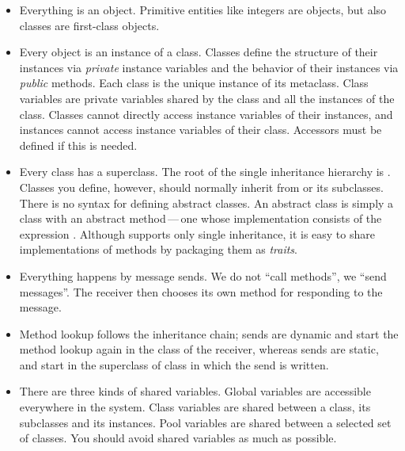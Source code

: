 \documentclass[a4paper,10pt,twoside]{book}
\begin{document}
\begin{itemize}
  \item Everything is an object.
  Primitive entities like integers are objects, but also classes are first-class objects.

  \item Every object is an instance of a class.
  Classes define the structure of their instances via \emph{private} instance variables and the behavior of their instances via \emph{public} methods.
  Each class is the unique instance of its metaclass.
  Class variables are private variables shared by the class and all the instances of the class.
  Classes cannot directly access instance variables of their instances, and instances cannot access instance variables of their class.
  Accessors must be defined if this is needed.

  \item Every class has a superclass.
  The root of the single inheritance hierarchy is .
  Classes you define, however, should normally inherit from  or its subclasses.
  There is no syntax for defining abstract classes.
  An abstract class is simply a class with an abstract method\,---\,one
  whose implementation consists of the expression .
  Although \squeak supports only single inheritance, it is easy to share implementations of methods by packaging them as \emph{traits}.

  \item Everything happens by message sends.
	We do not ``call methods'', we ``send messages''.
	The receiver then chooses its own method for responding to the message.

  \item Method lookup follows the inheritance chain;
  \self sends are dynamic and start the method lookup again in the class of the receiver, whereas
  \super sends are static, and start in the superclass of class in which the \super send is written.

  \item There are three kinds of shared variables.
  		Global variables are accessible everywhere in the system.
		Class variables are shared between a class, its subclasses and its instances.
		Pool variables are shared between a selected set of classes.
		You should avoid shared variables as much as possible.

\end{itemize}

\ifx\wholebook\relax\else
   
   
\end{document}
